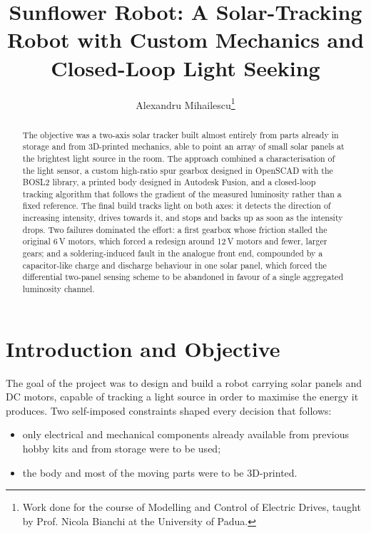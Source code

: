 \documentclass[10pt, conference, letterpaper]{IEEEtran}
\begin{document}
\title{Sunflower Robot: A Solar-Tracking Robot with Custom Mechanics and Closed-Loop Light Seeking}
\IEEEoverridecommandlockouts
\author{Alexandru Mihailescu\thanks{Work done for the course of Modelling and Control of Electric Drives, taught by Prof. Nicola Bianchi at the University of Padua.}}

\maketitle

\begin{abstract}
The objective was a two-axis solar tracker built almost entirely from parts already in storage and from 3D-printed mechanics, able to point an array of small solar panels at the brightest light source in the room. The approach combined a characterisation of the light sensor, a custom high-ratio spur gearbox designed in OpenSCAD with the BOSL2 library, a printed body designed in Autodesk Fusion, and a closed-loop tracking algorithm that follows the gradient of the measured luminosity rather than a fixed reference. The final build tracks light on both axes: it detects the direction of increasing intensity, drives towards it, and stops and backs up as soon as the intensity drops. Two failures dominated the effort: a first gearbox whose friction stalled the original 6\,V motors, which forced a redesign around 12\,V motors and fewer, larger gears; and a soldering-induced fault in the analogue front end, compounded by a capacitor-like charge and discharge behaviour in one solar panel, which forced the differential two-panel sensing scheme to be abandoned in favour of a single aggregated luminosity channel.
\end{abstract}

\section{Introduction and Objective}

The goal of the project was to design and build a robot carrying solar panels and DC motors, capable of tracking a light source in order to maximise the energy it produces. Two self-imposed constraints shaped every decision that follows:

\begin{itemize}
  \item only electrical and mechanical components already available from previous hobby kits and from storage were to be used;
  \item the body and most of the moving parts were to be 3D-printed.
\end{itemize}
\end{document}
